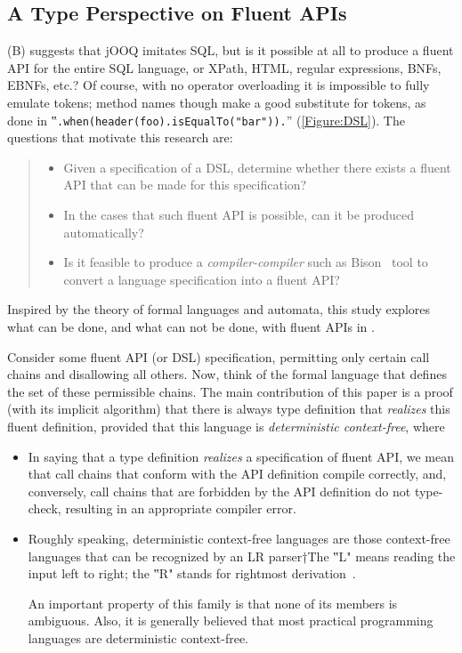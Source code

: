 \subsection{A Type Perspective on Fluent APIs}
(B) suggests that jOOQ imitates SQL,
but is it possible at all to produce a fluent API
for the entire SQL language,
or XPath, HTML, regular expressions, BNFs, EBNFs, etc.?
Of course, with no operator overloading it is impossible
to fully emulate tokens; method names though make a good substitute for tokens, as done
in ‟\lstinline{.when(header(foo).isEqualTo("bar")).}” (\cref{Figure:DSL}).
The questions that motivate this research are:
\begin{quote}
  \begin{itemize}
    \item Given a specification of a DSL, determine whether there exists
        a fluent API that can be made for this specification?
    \item In the cases that such fluent API is possible,
      can it be produced automatically?
    \item Is it feasible to produce a \emph{compiler-compiler} such as Bison~\cite{Bison:manual} tool
        to convert a language specification into a fluent API?
\end{itemize}
\end{quote}

Inspired by the theory of formal languages and automata,
  this study explores what can be done, and what can not be done, with fluent APIs in \Java.

Consider some fluent API (or DSL) specification, permitting only certain call
chains and disallowing all others.
Now, think of the formal language that defines the set of these permissible chains.
The main contribution of this paper is a proof (with its implicit algorithm) that
there is always \Java type definition that \emph{realizes} this fluent definition, provided that this
language is \emph{deterministic context-free}, where
\begin{itemize}
  \item In saying that a type definition \emph{realizes} a specification of fluent
    API, we mean that call chains that conform with the API definition compile
    correctly, and, conversely, call chains that are forbidden by the API
    definition do not type-check, resulting in an appropriate compiler error.
  \item Roughly speaking, deterministic context-free languages are those
    context-free languages that can be recognized by an LR parser†{The ‟L"
    means reading the input left to right; the ‟R" stands for rightmost derivation}~\cite{Aho:86}.
    \par
    An important property of this family is that none of its members is ambiguous.
    Also, it is generally believed that most practical programming languages
    are deterministic context-free.
\end{itemize}

